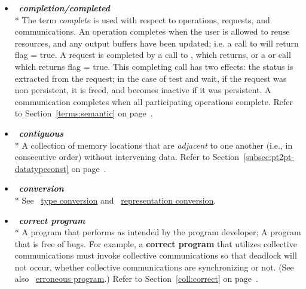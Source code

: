\begin{itemize}
\label{glossary:completion_completed}
\item  ~\hypertarget{glossary:completion_completed}{\emph{\textbf{completion/completed}}} \\*
The term \emph{complete} is used with respect to operations, requests, and communications. 
An operation completes when the user is allowed to reuse resources, and any output 
buffers have been updated; i.e. a call to  will return flag = true. A request is 
completed by a call to , which returns, or a  or  
call which returns flag = true. 
This completing call has two effects: the status is extracted from the request; in the case 
of test and wait, if the request was non persistent, it is freed, and becomes inactive if it 
was persistent. A communication completes when all participating operations complete.
Refer to Section~\ref{terms:semantic} on page~\pageref{terms:semantic}.

\label{glossary:contiguous}
\item  ~\hypertarget{glossary:contiguous}{\emph{\textbf{contiguous}}} \\*
A collection of memory locations that are \emph{adjacent} to one another
(i.e., in consecutive order)
without intervening data.
Refer to Section~\ref{subsec:pt2pt-datatypeconst} on page~\pageref{subsec:pt2pt-datatypeconst}.

\label{glossary:conversion}
\item  ~\hypertarget{glossary:conversion}{\emph{\textbf{conversion}}} \\*
See ~\hyperlink{glossary:type_conversion}{type conversion} and ~\hyperlink{glossary:representation_conversion}{representation conversion}.

\label{glossary:correct_program}
\item  ~\hypertarget{glossary:correct_program}{\emph{\textbf{correct program}}} \\*
A program that performs as intended by the program developer; A program that is free of bugs. 
For example, a  {\bf correct program} that utilizes collective communications
must invoke collective communications so
that deadlock will
not occur, whether collective communications are synchronizing or not.
(See also ~\hyperlink{glossary:erroneous_program}{erroneous program}.)
Refer to Section~\ref{coll:correct} on page~\pageref{coll:correct}.


\end{itemize}
